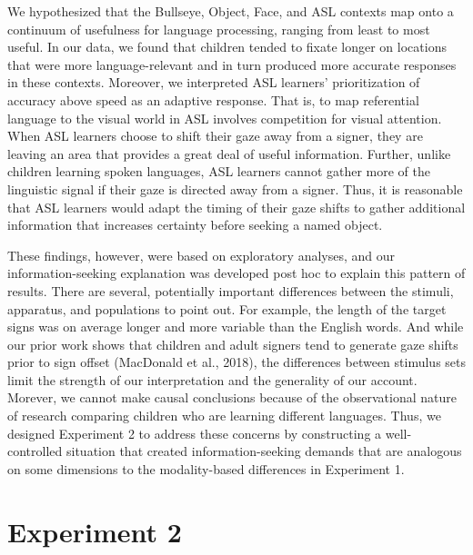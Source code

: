 \documentclass[,man,floatsintext]{apa6}
\begin{document}
We hypothesized that the Bullseye, Object, Face, and ASL contexts map onto a continuum of usefulness for language processing, ranging from least to most useful. In our data, we found that children tended to fixate longer on locations that were more language-relevant and in turn produced more accurate responses in these contexts. Moreover, we interpreted ASL learners' prioritization of accuracy above speed as an adaptive response. That is, to map referential language to the visual world in ASL involves competition for visual attention. When ASL learners choose to shift their gaze away from a signer, they are leaving an area that provides a great deal of useful information. Further, unlike children learning spoken languages, ASL learners cannot gather more of the linguistic signal if their gaze is directed away from a signer. Thus, it is reasonable that ASL learners would adapt the timing of their gaze shifts to gather additional information that increases certainty before seeking a named object.

These findings, however, were based on exploratory analyses, and our information-seeking explanation was developed post hoc to explain this pattern of results. There are several, potentially important differences between the stimuli, apparatus, and populations to point out. For example, the length of the target signs was on average longer and more variable than the English words. And while our prior work shows that children and adult signers tend to generate gaze shifts prior to sign offset (MacDonald et al., 2018), the differences between stimulus sets limit the strength of our interpretation and the generality of our account. Morever, we cannot make causal conclusions because of the observational nature of research comparing children who are learning different languages. Thus, we designed Experiment 2 to address these concerns by constructing a well-controlled situation that created information-seeking demands that are analogous on some dimensions to the modality-based differences in Experiment 1.

\hypertarget{experiment-2}{%
\section{Experiment 2}\label{experiment-2}}
\end{document}

